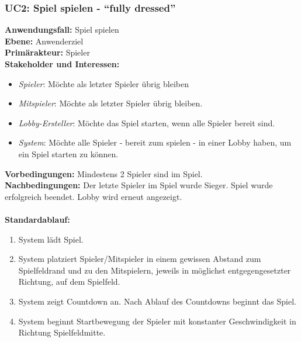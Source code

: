 \documentclass[11pt,ngerman]{article}
\newcommand{\quotes}[1]{``#1''}
\begin{document}
        \subsubsection{UC2: Spiel spielen - \quotes{fully dressed}}
            \begin{tcolorbox}[enhanced, breakable, sharp corners, width=\dimexpr\textwidth-15mm\relax ,enlarge left by=10mm ,fontupper=\linespread{1.1}\selectfont, boxrule=1pt, title={UC2: Spiel spielen}, colback=white, colframe=gray!22, coltitle=black]

                \textbf{Anwendungsfall:} Spiel spielen \\
                \textbf{Ebene:} Anwenderziel \\
                \textbf{Primärakteur:} Spieler \\
                \textbf{Stakeholder und Interessen:}
                \begin{itemize}
                    \item \textit{Spieler}: Möchte als letzter Spieler übrig bleiben
                    \item \textit{Mitspieler}: Möchte als letzter Spieler übrig bleiben.
                    \item \textit{Lobby-Ersteller}:  Möchte das Spiel starten, wenn alle Spieler bereit sind.
                    \item \textit{System}: Möchte alle Spieler - bereit zum spielen - in einer Lobby haben, um ein Spiel starten zu können.
                \end{itemize}
                \textbf{Vorbedingungen:} Mindestens 2 Spieler sind im Spiel.\\
                \textbf{Nachbedingungen:} Der letzte Spieler im Spiel wurde Sieger. Spiel wurde erfolgreich beendet. Lobby wird erneut angezeigt. \\
               \\  \textbf{Standardablauf:}
                \begin{enumerate}
                    \item System lädt Spiel.
                    \item System platziert Spieler/Mitspieler in einem gewissen Abstand zum Spielfeldrand und zu den Mitspielern, jeweils in möglichst entgegengesetzter Richtung, auf dem Spielfeld.
                    \item System zeigt Countdown an. Nach Ablauf des Countdowns beginnt das Spiel.
                    \item System beginnt Startbewegung der Spieler mit konstanter Geschwindigkeit in Richtung Spielfeldmitte.

\end{enumerate}
\end{tcolorbox}
\end{document}
